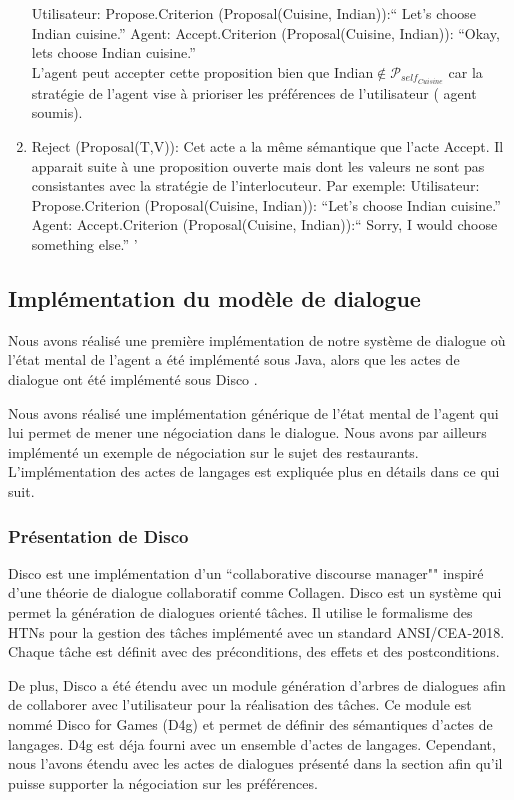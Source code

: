 \documentclass[a4paper,french]{article}
\begin{document}
\begin{enumerate}
		\subitem Utilisateur: Propose.Criterion (Proposal(Cuisine, Indian)):`` Let's choose Indian cuisine.''
		\subitem Agent: Accept.Criterion (Proposal(Cuisine, Indian)): ``Okay, lets choose Indian cuisine.''
		\\L'agent peut accepter cette proposition bien que Indian$\notin \mathcal{P}_{self_{Cuisine}}$ car la stratégie de l'agent vise à prioriser  les préférences de l'utilisateur ( agent soumis).
		\\	
		\item Reject (Proposal(T,V)): Cet acte a la même sémantique que l'acte Accept. Il apparait suite à une proposition ouverte mais dont les valeurs ne sont pas consistantes avec la stratégie de l'interlocuteur. Par exemple: 
		\subitem Utilisateur: Propose.Criterion (Proposal(Cuisine, Indian)): ``Let's choose Indian cuisine.'' 
		\subitem Agent: Accept.Criterion (Proposal(Cuisine, Indian)):`` Sorry, I would choose something else.'' ' 
	
\end{enumerate}

\subsection{Implémentation du modèle de dialogue}
\par Nous avons réalisé une première implémentation de notre système de dialogue où l'état mental de l'agent a été implémenté sous Java, alors que les actes de dialogue ont été implémenté sous Disco \cite{rich2009building}.
\par Nous avons réalisé une implémentation générique de l'état mental de l'agent qui lui permet de mener une négociation dans le dialogue. Nous avons par ailleurs implémenté un exemple de négociation sur le sujet des restaurants.  L'implémentation des actes de langages est expliquée plus en détails dans ce qui suit.
\subsubsection{Présentation de Disco}
Disco est une implémentation d'un ``collaborative discourse manager"" inspiré d'une théorie de dialogue collaboratif comme Collagen.  Disco est un système qui permet la génération de dialogues orienté tâches. Il utilise le formalisme des HTNs pour la gestion des tâches implémenté avec un standard ANSI/CEA-2018.
Chaque tâche est définit avec des préconditions, des effets et des postconditions. 
\par De plus, Disco a été étendu avec un module génération d'arbres de dialogues afin de collaborer avec l'utilisateur pour la réalisation des tâches. Ce module est nommé Disco for Games (D4g) et permet de définir des sémantiques d'actes de langages. D4g est déja fourni avec un ensemble d'actes de langages. Cependant, nous l'avons étendu avec les actes de dialogues présenté dans la section afin qu'il puisse supporter la négociation sur les préférences. 
\end{document}
